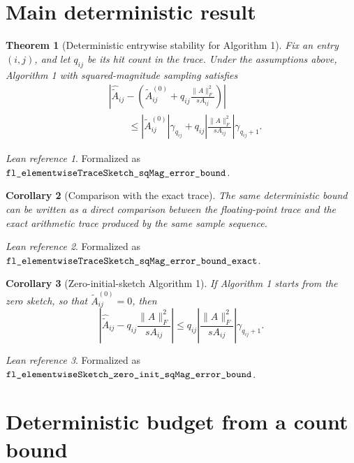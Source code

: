 \documentclass[11pt]{article}
\newcommand{\Frob}[1]{\lVert #1\rVert_F}
\newcommand{\lean}[1]{\texttt{\detokenize{#1}}}
\newtheorem{theorem}{Theorem}
\newtheorem{corollary}[theorem]{Corollary}
\theoremstyle{definition}
\theoremstyle{remark}
\newtheorem*{leanref}{Lean reference}
\begin{document}
\section*{Main deterministic result}

\begin{theorem}[Deterministic entrywise stability for Algorithm 1]
Fix an entry \((i,j)\), and let \(q_{ij}\) be its hit count in the trace. Under
the assumptions above, Algorithm 1 with squared-magnitude sampling satisfies
\[
\begin{aligned}
&\left|
  \widehat{\widetilde A}_{ij}
  -
  \left(
    \widetilde A^{(0)}_{ij}
    +
    q_{ij}\frac{\Frob{A}^2}{s A_{ij}}
  \right)
\right| \\
&\qquad\le
  \left|\widetilde A^{(0)}_{ij}\right|\gamma_{q_{ij}}
  +
  q_{ij}
  \left|\frac{\Frob{A}^2}{s A_{ij}}\right|
  \gamma_{q_{ij}+1}.
\end{aligned}
\]
\end{theorem}

\begin{leanref}
Formalized as \(\lean{fl_elementwiseTraceSketch_sqMag_error_bound}\).
\end{leanref}

\begin{corollary}[Comparison with the exact trace]
The same deterministic bound can be written as a direct comparison between the
floating-point trace and the exact arithmetic trace produced by the same sample
sequence.
\end{corollary}

\begin{leanref}
Formalized as \(\lean{fl_elementwiseTraceSketch_sqMag_error_bound_exact}\).
\end{leanref}

\begin{corollary}[Zero-initial-sketch Algorithm 1]
If Algorithm 1 starts from the zero sketch, so that
\(\widetilde A^{(0)}_{ij}=0\), then
\[
\left|
  \widehat{\widetilde A}_{ij}
  -
  q_{ij}\frac{\Frob{A}^2}{s A_{ij}}
\right|
\le
q_{ij}
\left|\frac{\Frob{A}^2}{s A_{ij}}\right|
\gamma_{q_{ij}+1}.
\]
\end{corollary}

\begin{leanref}
Formalized as \(\lean{fl_elementwiseSketch_zero_init_sqMag_error_bound}\).
\end{leanref}

\section*{Deterministic budget from a count bound}
\end{document}
